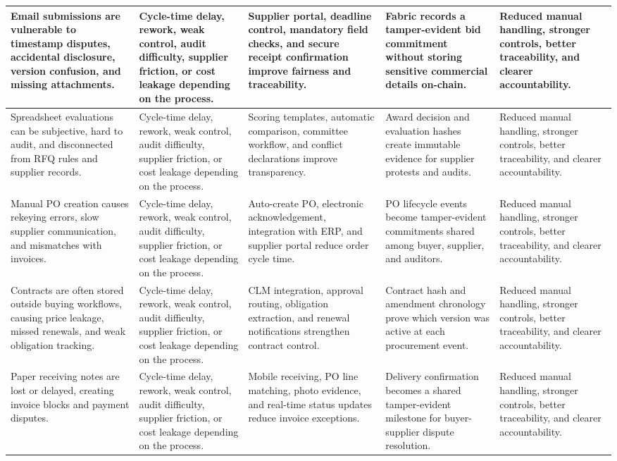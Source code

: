 \documentclass[conference]{IEEEtran}
\begin{document}
\begin{table}[t]
\begin{tabularx}{\textwidth}{|Y|Y|Y|Y|Y|}
Email submissions are vulnerable to timestamp disputes, accidental disclosure, version confusion, and missing attachments. & Cycle-time delay, rework, weak control, audit difficulty, supplier friction, or cost leakage depending on the process. & Supplier portal, deadline control, mandatory field checks, and secure receipt confirmation improve fairness and traceability. & Fabric records a tamper-evident bid commitment without storing sensitive commercial details on-chain. & Reduced manual handling, stronger controls, better traceability, and clearer accountability. \\ \hline
Spreadsheet evaluations can be subjective, hard to audit, and disconnected from RFQ rules and supplier records. & Cycle-time delay, rework, weak control, audit difficulty, supplier friction, or cost leakage depending on the process. & Scoring templates, automatic comparison, committee workflow, and conflict declarations improve transparency. & Award decision and evaluation hashes create immutable evidence for supplier protests and audits. & Reduced manual handling, stronger controls, better traceability, and clearer accountability. \\ \hline
Manual PO creation causes rekeying errors, slow supplier communication, and mismatches with invoices. & Cycle-time delay, rework, weak control, audit difficulty, supplier friction, or cost leakage depending on the process. & Auto-create PO, electronic acknowledgement, integration with ERP, and supplier portal reduce order cycle time. & PO lifecycle events become tamper-evident commitments shared among buyer, supplier, and auditors. & Reduced manual handling, stronger controls, better traceability, and clearer accountability. \\ \hline
Contracts are often stored outside buying workflows, causing price leakage, missed renewals, and weak obligation tracking. & Cycle-time delay, rework, weak control, audit difficulty, supplier friction, or cost leakage depending on the process. & CLM integration, approval routing, obligation extraction, and renewal notifications strengthen contract control. & Contract hash and amendment chronology prove which version was active at each procurement event. & Reduced manual handling, stronger controls, better traceability, and clearer accountability. \\ \hline
Paper receiving notes are lost or delayed, creating invoice blocks and payment disputes. & Cycle-time delay, rework, weak control, audit difficulty, supplier friction, or cost leakage depending on the process. & Mobile receiving, PO line matching, photo evidence, and real-time status updates reduce invoice exceptions. & Delivery confirmation becomes a shared tamper-evident milestone for buyer-supplier dispute resolution. & Reduced manual handling, stronger controls, better traceability, and clearer accountability. \\ \hline

\end{tabularx}
\end{table}
\end{document}
